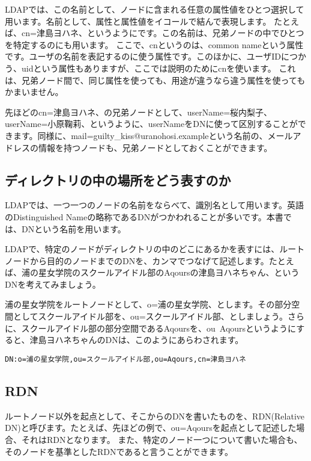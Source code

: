 LDAPでは、この名前として、ノードに含まれる任意の属性値をひとつ選択して用います。名前として、属性と属性値をイコールで結んで表現します。
たとえば、cn=津島ヨハネ、というようにです。この名前は、兄弟ノードの中でひとつを特定するのにも用います。
ここで、cnというのは、common nameという属性です。ユーザの名前を表記するのに使う属性です。このほかに、ユーザIDにつかう、uidという属性もありますが、ここでは説明のためにcnを使います。
これは、兄弟ノード間で、同じ属性を使っても、用途が違うなら違う属性を使ってもかまいません。

先ほどのcn=津島ヨハネ、の兄弟ノードとして、userName=桜内梨子、userName=小原鞠莉、というように、userNameをDNに使って区別することができます。同様に、mail=guilty\_kiss@uranohosi.exampleという名前の、メールアドレスの情報を持つノードも、兄弟ノードとしておくことができます。

\subsection{ディレクトリの中の場所をどう表すのか}

LDAPでは、一つ一つのノードの名前をならべて、識別名として用います。英語のDistinguished Nameの略称であるDNがつかわれることが多いです。本書では、DNという名前を用います。

LDAPで、特定のノードがディレクトリの中のどこにあるかを表すには、ルートノードから目的のノードまでのDNを、カンマでつなげて記述します。たとえば、浦の星女学院のスクールアイドル部のAqoursの津島ヨハネちゃん、というDNを考えてみましょう。

浦の星女学院をルートノードとして、o=浦の星女学院、とします。その部分空間としてスクールアイドル部を、ou=スクールアイドル部、としましょう。さらに、スクールアイドル部の部分空間であるAqoursを、ou~Aqoursというようにすると、津島ヨハネちゃんのDNは、このようにあらわされます。

\begin{verbatim}
DN:o=浦の星女学院,ou=スクールアイドル部,ou=Aqours,cn=津島ヨハネ
\end{verbatim}

\subsection{RDN}

ルートノード以外を起点として、そこからのDNを書いたものを、RDN(Relative DN)と呼びます。たとえば、先ほどの例で、ou=Aqoursを起点として記述した場合、それはRDNとなります。
また、特定のノード一つについて書いた場合も、そのノードを基準としたRDNであると言うことができます。

